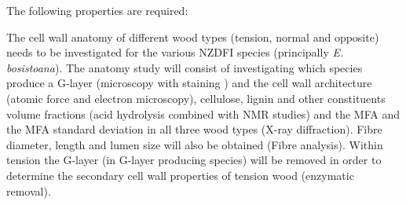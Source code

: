 The following properties are required:

The cell wall anatomy of different wood types (tension, normal and opposite)
needs to be investigated for the various NZDFI species (principally \textit{E.
bosistoana}). The anatomy study will consist of investigating which species
produce a G-layer (microscopy with staining \cite{Qiu_2008}) and the cell wall architecture
(atomic force and electron microscopy), cellulose, lignin and other constituents
volume fractions (acid hydrolysis combined with NMR studies)  and the MFA and
the MFA standard deviation in all three wood types (X-ray diffraction). Fibre
diameter, length and lumen size will also be obtained (Fibre analysis). Within
tension the G-layer (in G-layer producing species) will be
removed in order to determine the secondary cell wall properties of tension wood
(enzymatic removal).